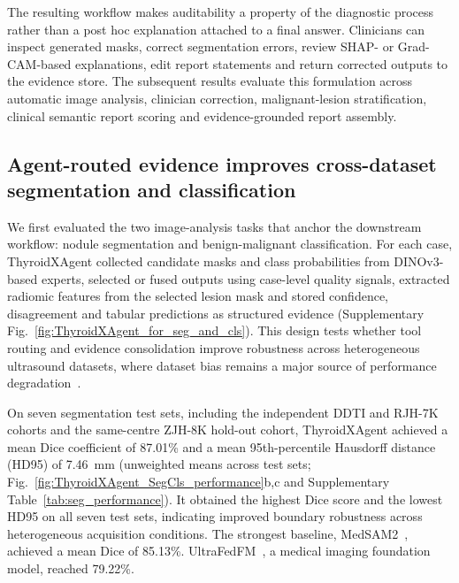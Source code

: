 \documentclass[fleqn,10pt]{wlscirep}
\begin{document}
The resulting workflow makes auditability a property of the diagnostic process rather than a post hoc explanation attached to a final answer. Clinicians can inspect generated masks, correct segmentation errors, review SHAP- or Grad-CAM-based explanations, edit report statements and return corrected outputs to the evidence store. The subsequent results evaluate this formulation across automatic image analysis, clinician correction, malignant-lesion stratification, clinical semantic report scoring and evidence-grounded report assembly.

\subsection{Agent-routed evidence improves cross-dataset segmentation and classification}

We first evaluated the two image-analysis tasks that anchor the downstream workflow: nodule segmentation and benign-malignant classification. For each case, ThyroidXAgent collected candidate masks and class probabilities from DINOv3-based experts, selected or fused outputs using case-level quality signals, extracted radiomic features from the selected lesion mask and stored confidence, disagreement and tabular predictions as structured evidence (Supplementary Fig.~\ref{fig:ThyroidXAgent_for_seg_and_cls}). This design tests whether tool routing and evidence consolidation improve robustness across heterogeneous ultrasound datasets, where dataset bias remains a major source of performance degradation~\cite{liu2024decade}.

On seven segmentation test sets, including the independent DDTI and RJH-7K cohorts and the same-centre ZJH-8K hold-out cohort, ThyroidXAgent achieved a mean Dice coefficient of 87.01\% and a mean 95th-percentile Hausdorff distance (HD95) of 7.46~mm (unweighted means across test sets; Fig.~\ref{fig:ThyroidXAgent_SegCls_performance}b,c and Supplementary Table~\ref{tab:seg_performance}). It obtained the highest Dice score and the lowest HD95 on all seven test sets, indicating improved boundary robustness across heterogeneous acquisition conditions. The strongest baseline, MedSAM2~\cite{ma2025medsam2}, achieved a mean Dice of 85.13\%. UltraFedFM~\cite{jiang2025pretraining}, a medical imaging foundation model, reached 79.22\%.
\end{document}
